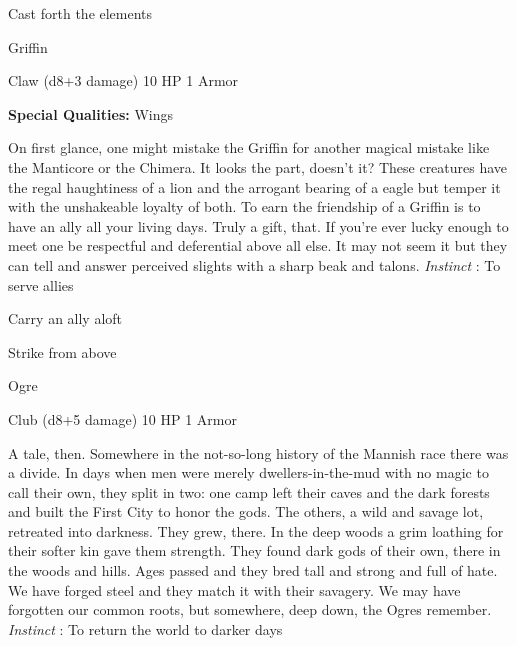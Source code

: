  
\item Cast forth the elements


\stopitemize
 
\startMonsterName
Griffin	 
\stopMonsterName
 

Claw (d8+3 damage)	10 HP	1 Armor

 


 
\startMonsterQualities
{\bf Special Qualities:}  Wings
\stopMonsterQualities
 
\startMonsterDescription
On first glance, one might mistake the Griffin for another magical mistake like the Manticore or the Chimera. It looks the part, doesn’t it? These creatures have the regal haughtiness of a lion and the arrogant bearing of a eagle but temper it with the unshakeable loyalty of both. To earn the friendship of a Griffin is to have an ally all your living days. Truly a gift, that. If you’re ever lucky enough to meet one be respectful and deferential above all else. It may not seem it but they can tell and answer perceived slights with a sharp beak and talons. {\em Instinct} : To serve allies
\stopMonsterDescription
 
\startitemize[1,packed]

\item Carry an ally aloft

 
\item Strike from above


\stopitemize
 
\startMonsterName
Ogre	 
\stopMonsterName
 

Club (d8+5 damage)	10 HP	1 Armor

 


 
\startMonsterDescription
A tale, then. Somewhere in the not-so-long history of the Mannish race there was a divide. In days when men were merely dwellers-in-the-mud with no magic to call their own, they split in two: one camp left their caves and the dark forests and built the First City to honor the gods. The others, a wild and savage lot, retreated into darkness. They grew, there. In the deep woods a grim loathing for their softer kin gave them strength. They found dark gods of their own, there in the woods and hills. Ages passed and they bred tall and strong and full of hate. We have forged steel and they match it with their savagery. We may have forgotten our common roots, but somewhere, deep down, the Ogres remember. {\em Instinct} : To return the world to darker days
\stopMonsterDescription
 
